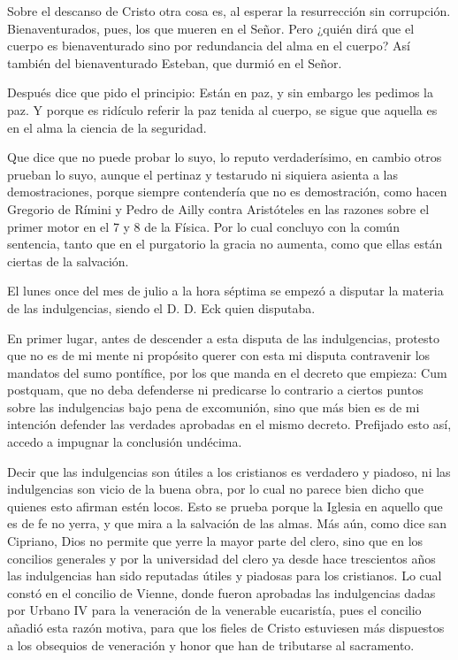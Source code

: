Sobre el descanso de Cristo otra cosa es, al esperar la resurrección sin corrupción. Bienaventurados, pues, los que mueren en el Señor. Pero ¿quién dirá que el cuerpo es bienaventurado sino por redundancia del alma en el cuerpo? Así también del bienaventurado Esteban, que durmió en el Señor.

Después dice que pido el principio: Están en paz, y sin embargo les pedimos la paz. Y porque es ridículo referir la paz tenida al cuerpo, se sigue que aquella es en el alma la ciencia de la seguridad.

Que dice que no puede probar lo suyo, lo reputo verdaderísimo, en cambio otros prueban lo suyo, aunque el pertinaz y testarudo ni siquiera asienta a las demostraciones, porque siempre contendería que no es demostración, como hacen Gregorio de Rímini y Pedro de Ailly contra Aristóteles en las razones sobre el primer motor en el 7 y 8 de la Física. Por lo cual concluyo con la común sentencia, tanto que en el purgatorio la gracia no aumenta, como que ellas están ciertas de la salvación.

El lunes once del mes de julio a la hora séptima se empezó a disputar la materia de las indulgencias, siendo el D. D. Eck quien disputaba.

En primer lugar, antes de descender a esta disputa de las indulgencias, protesto que no es de mi mente ni propósito querer con esta mi disputa contravenir los mandatos del sumo pontífice, por los que manda en el decreto que empieza: Cum postquam, que no deba defenderse ni predicarse lo contrario a ciertos puntos sobre las indulgencias bajo pena de excomunión, sino que más bien es de mi intención defender las verdades aprobadas en el mismo decreto. Prefijado esto así, accedo a impugnar la conclusión undécima.

Decir que las indulgencias son útiles a los cristianos es verdadero y piadoso, ni las indulgencias son vicio de la buena obra, por lo cual no parece bien dicho que \marginpar{\small[345]} quienes esto afirman estén locos. Esto se prueba porque la Iglesia en aquello que es de fe no yerra, y que mira a la salvación de las almas. Más aún, como dice san Cipriano, Dios no permite que yerre la mayor parte del clero, sino que en los concilios generales y por la universidad del clero ya desde hace trescientos años las indulgencias han sido reputadas útiles y piadosas para los cristianos. Lo cual constó en el concilio de Vienne, donde fueron aprobadas las indulgencias dadas por Urbano IV para la veneración de la venerable eucaristía, pues el concilio añadió esta razón motiva, para que los fieles de Cristo estuviesen más dispuestos a los obsequios de veneración y honor que han de tributarse al sacramento.

